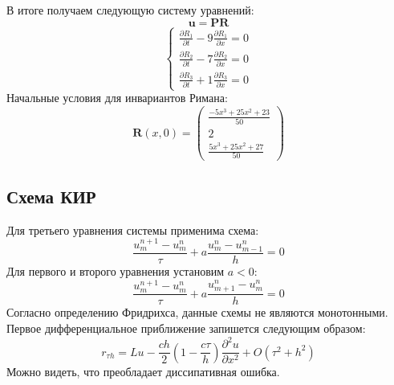 \documentclass[a4paper,14pt]{article}
\begin{document}
    \vspace{1cm}
    В итоге получаем следующую систему уравнений:
    \begin{equation}
    \mathbf{u}=\mathbf{PR}
    \end{equation}
    \begin{equation}
    \begin{cases} \frac{\partial R_1}{\partial t} -9\frac{\partial R_1}{\partial x}=0 \\ \frac{\partial R_2}{\partial t} -7\frac{\partial R_2}{\partial x}=0 \\ \frac{\partial R_3}{\partial t} + 1\frac{\partial R_3}{\partial x}=0 \end{cases}
    \end{equation}
    \vspace{1.5cm}
    Начальные условия для инвариантов Римана:
    \begin{equation}
    \mathbf{R}(x, 0) = \left( \begin{array}{c}{\frac{-5x^{3}+25x^{2}+23}{50}} \\ {2} \\ {\frac{5x^{3}+25x^{2}+27}{50}}\end{array}\right)
    \end{equation}
    \vspace{0.5cm}
    
    \newpage
    \subsection{Схема КИР}
    Для третьего уравнения системы применима схема:
    \begin{equation}
    \frac{u_{m}^{n+1}-u_{m}^{n}}{\tau}+a \frac{u_{m}^{n}-u_{m-1}^{n}}{h}=0
    \end{equation}
    \vspace{0.5cm}
    Для первого и второго уравнения установим $a<0$:
    \begin{equation}
    \frac{u_{m}^{n+1}-u_{m}^{n}}{\tau}+a \frac{u_{m+1}^{n}-u_{m}^{n}}{h}=0
    \end{equation}
    \vspace{0.5cm}
    Согласно определению Фридрихса, данные схемы не являются монотонными. Первое дифференциальное приближение запишется следующим образом:
    \begin{equation}
    r_{\tau h}=L u-\frac{c h}{2}\left(1-\frac{c \tau}{h}\right) \frac{\partial^{2} u}{\partial x^{2}}+O\left(\tau^{2}+h^{2}\right)
    \end{equation}
    \vspace{0.5cm}
    Можно видеть, что преобладает диссипативная ошибка.
\end{document}
